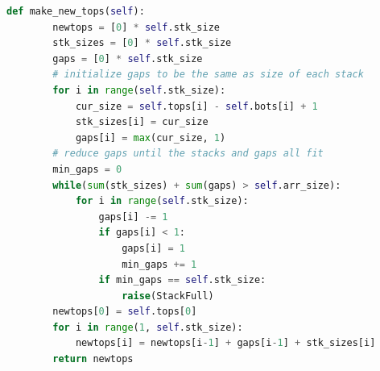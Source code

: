 \documentclass[12pt]{report}
\begin{document}
\begin{lstlisting}[language=Python, caption=multistack.py]
    def make_new_tops(self):
        newtops = [0] * self.stk_size
        stk_sizes = [0] * self.stk_size
        gaps = [0] * self.stk_size
        # initialize gaps to be the same as size of each stack
        for i in range(self.stk_size):
            cur_size = self.tops[i] - self.bots[i] + 1
            stk_sizes[i] = cur_size
            gaps[i] = max(cur_size, 1)
        # reduce gaps until the stacks and gaps all fit
        min_gaps = 0
        while(sum(stk_sizes) + sum(gaps) > self.arr_size):
            for i in range(self.stk_size):
                gaps[i] -= 1
                if gaps[i] < 1:
                    gaps[i] = 1
                    min_gaps += 1
                if min_gaps == self.stk_size:
                    raise(StackFull)
        newtops[0] = self.tops[0]
        for i in range(1, self.stk_size):
            newtops[i] = newtops[i-1] + gaps[i-1] + stk_sizes[i]
        return newtops
\end{lstlisting}
\end{document}
